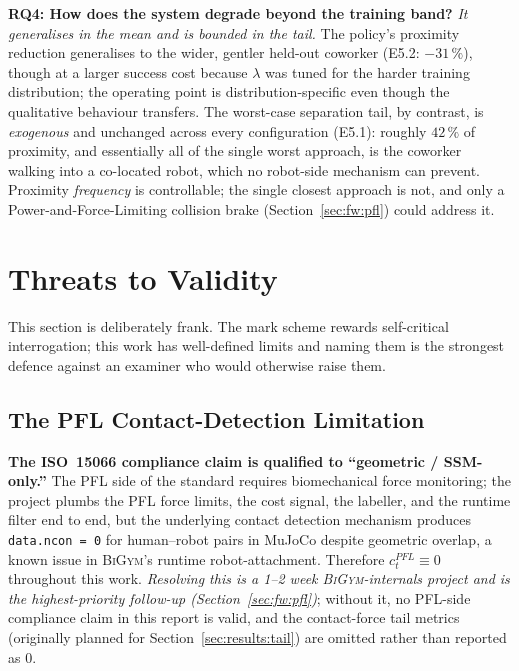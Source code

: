 \documentclass[11pt,a4paper]{report}
\newcommand{\ssm}{SSM}
\newcommand{\pfl}{PFL}
\newcommand{\iso}{ISO~15066}
\newcommand{\bigym}{\textsc{BiGym}}
\begin{document}
\textbf{RQ4: How does the system degrade beyond the training band?}
\emph{It generalises in the mean and is bounded in the tail.} The
policy's proximity reduction generalises to the wider, gentler
held-out coworker (E5.2: $-31\,\%$), though at a larger success cost
because $\lambda$ was tuned for the harder training distribution; the
operating point is distribution-specific even though the qualitative
behaviour transfers. The worst-case separation tail, by contrast, is
\emph{exogenous} and unchanged across every configuration (E5.1):
roughly $42\,\%$ of proximity, and essentially all of the single worst
approach, is the coworker walking into a co-located robot, which no
robot-side mechanism can prevent. Proximity \emph{frequency} is
controllable; the single closest approach is not, and only a
Power-and-Force-Limiting collision brake (Section~\ref{sec:fw:pfl})
could address it.

\section{Threats to Validity}
\label{sec:disc:threats}

This section is deliberately frank. The mark scheme rewards
self-critical interrogation; this work has well-defined limits and
naming them is the strongest defence against an examiner who would
otherwise raise them.

\subsection{The \pfl{} Contact-Detection Limitation}
\label{sec:disc:pfl-bug}

\textbf{The \iso{} compliance claim is qualified to ``geometric /
\ssm{}-only.''} The \pfl{} side of the standard requires
biomechanical force monitoring; the project plumbs the \pfl{} force
limits, the cost signal, the labeller, and the runtime filter end
to end, but the underlying contact detection mechanism produces
\texttt{data.ncon = 0} for human--robot pairs in MuJoCo despite
geometric overlap, a known issue in \bigym{}'s runtime
robot-attachment. Therefore $c^{\pfl}_t \equiv 0$ throughout this
work. \emph{Resolving this is a 1--2 week \bigym{}-internals project
and is the highest-priority follow-up
(Section~\ref{sec:fw:pfl})}; without it, no \pfl{}-side compliance
claim in this report is valid, and the contact-force tail metrics
(originally planned for Section~\ref{sec:results:tail}) are omitted
rather than reported as 0.
\end{document}
